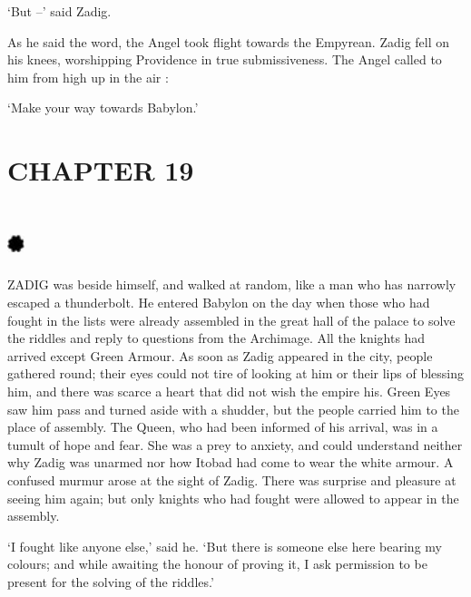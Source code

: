 \documentclass{article}
\begin{document}
\begin{center}
`But –' said Zadig. 

As he said the word, the Angel took flight towards the Empyrean. Zadig fell on 
his knees, worshipping Providence in true submissiveness. The Angel called to him 
from high up in the air : 

`Make your way towards Babylon.'\pagebreak{} 

\section*{\textbf{CHAPTER 19  }}

\section*{%
\includegraphics[width=14pt, height=15pt, keepaspectratio=true]{Zadig or L'Ingenu - Voltaire-fig022.jpg}
}

 

ZADIG was beside himself, and walked at random, like a man who has narrowly escaped 
a thunderbolt. He entered Babylon on the day when those who had fought in the lists 
were already assembled in the great hall of the palace to solve the riddles and 
reply to questions from the Archimage. All the knights had arrived except Green 
Armour. As soon as Zadig appeared in the city, people gathered round; their eyes 
could not tire of looking at him or their lips of blessing him, and there was scarce 
a heart that did not wish the empire his. Green Eyes saw him pass and turned aside 
with a shudder, but the people carried him to the place of assembly. The Queen, 
who had been informed of his arrival, was in a tumult of hope and fear. She was 
a prey to anxiety, and could understand neither why Zadig was unarmed nor how Itobad 
had come to wear the white armour. A confused murmur arose at the sight of Zadig. 
There was surprise and pleasure at seeing him again; but only knights who had fought 
were allowed to appear in the assembly. 

`I fought like anyone else,' said he. `But there is someone else here bearing my 
colours; and while awaiting the honour of proving it, I ask permission to be present 
for the solving of the riddles.' 


\end{center}
\end{document}
